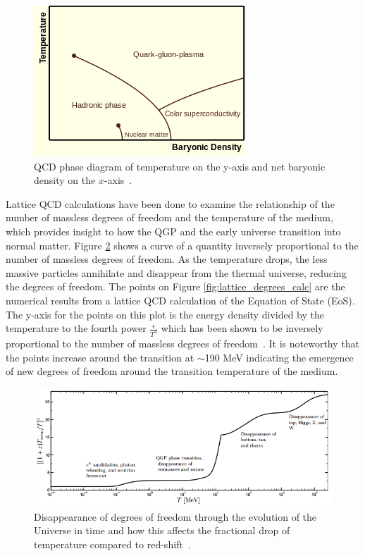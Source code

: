 \begin{figure}[!ht]
\centering
\includegraphics[width=0.55\linewidth]{figs/qcd_phase_diagram.png}
\caption{QCD phase diagram of temperature on the y-axis and net baryonic density on the $x$-axis~\cite{Bhalerao:2014owa}.}
\label{fig:qcd_phase}
\end{figure}

Lattice QCD calculations have been done to examine the relationship of the number of massless degrees of freedom and the temperature of the medium, which provides insight to how the QGP and the early universe transition into normal matter. Figure \ref{fig:lattice_degrees} shows a curve of a quantity inversely proportional to the number of massless degrees of freedom. As the temperature drops, the less massive particles annihilate and disappear from the thermal universe, reducing the degrees of freedom. The points on Figure \ref{fig:lattice_degrees_calc} are the numerical results from a lattice QCD calculation of the Equation of State (EoS). The y-axis for the points on this plot is the energy density divided by the temperature to the fourth power $\frac{\epsilon}{T^4}$ which has been shown to be inversely proportional to the number of massless degrees of freedom~\cite{PhysRevD.81.054504}. It is noteworthy that the points increase around the transition at $\sim$190 MeV indicating the emergence of new degrees of freedom around the transition temperature of the medium.

\begin{figure}[!ht]
\centering
\includegraphics[width=0.79\linewidth]{figs/lattice_degrees_plot.PNG}
\caption{Disappearance of degrees of freedom through the evolution of the Universe in time
and how this affects the fractional drop of temperature compared to red-shift~\cite{1742-6596-509-1-012014}.}
\label{fig:lattice_degrees}
\end{figure}

